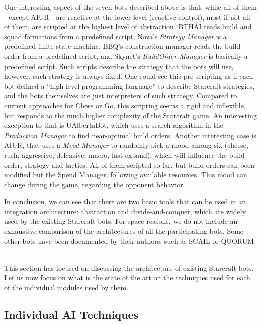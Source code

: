 \documentclass[journal]{IEEEtran}
\begin{document}
One  interesting aspect  of the  seven bots  described above  is that,
while all  of them  - except AIUR  - are  reactive at the  lower level
(reactive  control), most  if not  all of  them, are  scripted  at the
highest level  of abstraction. BTHAI reads build  and squad formations
from  a  predefined  script,   Nova's  {\em  Strategy  Manager}  is  a
predefined finite-state machine,  BBQ's construction manager reads the
build  order from a  predefined script,  and Skynet's  {\em BuildOrder
  Manager} is basically a predefined script. Such scripts describe the
strategy  that the  bots will  use, however,  such strategy  is always
fixed.   One could see  this pre-scripting  as if  each bot  defined a
``high-level programming language''  to describe Starcraft strategies,
and   the   bots   themselves    are   just   interpreters   of   such
strategy.  Compared  to  current  approaches  for Chess  or  Go,  this
scripting  seems a  rigid and  inflexible,  but responds  to the  much
higher complexity of the  Starcraft game.  An interesting exception to
that  is  UAlbertaBot, which  uses  a  search  algorithm in  the  {\em
  Production  Manager}  to find  near-optimal  build orders.   Another
interesting case is  AIUR, that uses a {\em  Mood Manager} to randomly
pick  a mood among  six (cheese,  rush, aggressive,  defensive, macro,
fast  expand), which  will  influence the  build  order, strategy  and
tactics.  All of  them  scripted so  far,  but build  orders can  been
modified but  the Spend Manager, following  available resources.  This
mood can change during the game, regarding the opponent behavior.

In conclusion, we can see that there are two basic tools that can be used in an integration architecture: abstraction and divide-and-conquer, which are widely used by the existing Starcraft bots. For space reasons, we do not include an exhaustive comparison of the architectures of all the participating bots. Some other bots have been documented by their authors, such as SCAIL \cite{YoungSCAIL} or QUORUM \cite{young2012evolutionary}.

This section has focused on discussing the architecture of existing Starcraft bots. Let us now focus on what is the state of the art on the techniques used for each of the individual modules used by them.

\subsection{Individual AI Techniques}\label{sec:techniques}
\end{document}
